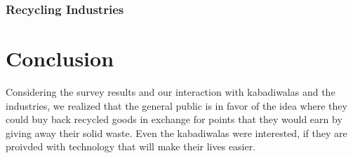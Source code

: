 \documentclass{article}
\begin{document}
\subsubsection{Recycling Industries}



\section{Conclusion}
\par Considering the survey results and our interaction with kabadiwalas and the industries, we realized that the general public is in favor of the idea where they could buy back recycled goods in exchange for points that they would earn by giving away their solid waste. Even the kabadiwalas were interested, if they are proivded with technology that will make their lives easier.
\end{document}
